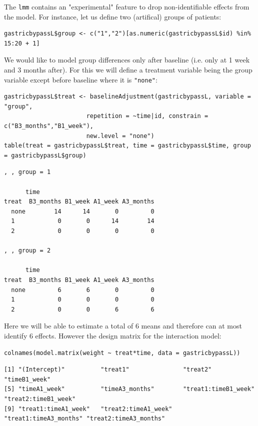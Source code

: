 \documentclass[12pt]{article}
\begin{document}
The \texttt{lmm} contains an "experimental" feature to drop non-identifiable
effects from the model. For instance, let us define two (artifical) groups of
patients:
\lstset{language=r,label= ,caption= ,captionpos=b,numbers=none}
\begin{lstlisting}
gastricbypassL$group <- c("1","2")[as.numeric(gastricbypassL$id) %in% 15:20 + 1]
\end{lstlisting}
We would like to model group differences only after baseline
(i.e. only at 1 week and 3 months after). For this we will define a
treatment variable being the group variable except before baseline where
it is \texttt{"none"}:
\lstset{language=r,label= ,caption= ,captionpos=b,numbers=none}
\begin{lstlisting}
gastricbypassL$treat <- baselineAdjustment(gastricbypassL, variable = "group",
					   repetition = ~time|id, constrain = c("B3_months","B1_week"),
					   new.level = "none")
table(treat = gastricbypassL$treat, time = gastricbypassL$time, group = gastricbypassL$group)
\end{lstlisting}

\begin{verbatim}
, , group = 1

      time
treat  B3_months B1_week A1_week A3_months
  none        14      14       0         0
  1            0       0      14        14
  2            0       0       0         0

, , group = 2

      time
treat  B3_months B1_week A1_week A3_months
  none         6       6       0         0
  1            0       0       0         0
  2            0       0       6         6
\end{verbatim}

Here we will be able to estimate a total of 6 means and therefore can
at most identify 6 effects. However the design matrix for the
interaction model:
\lstset{language=r,label= ,caption= ,captionpos=b,numbers=none}
\begin{lstlisting}
colnames(model.matrix(weight ~ treat*time, data = gastricbypassL))
\end{lstlisting}

\begin{verbatim}
[1] "(Intercept)"          "treat1"               "treat2"               "timeB1_week"         
[5] "timeA1_week"          "timeA3_months"        "treat1:timeB1_week"   "treat2:timeB1_week"  
[9] "treat1:timeA1_week"   "treat2:timeA1_week"   "treat1:timeA3_months" "treat2:timeA3_months"
\end{verbatim}
\end{document}

